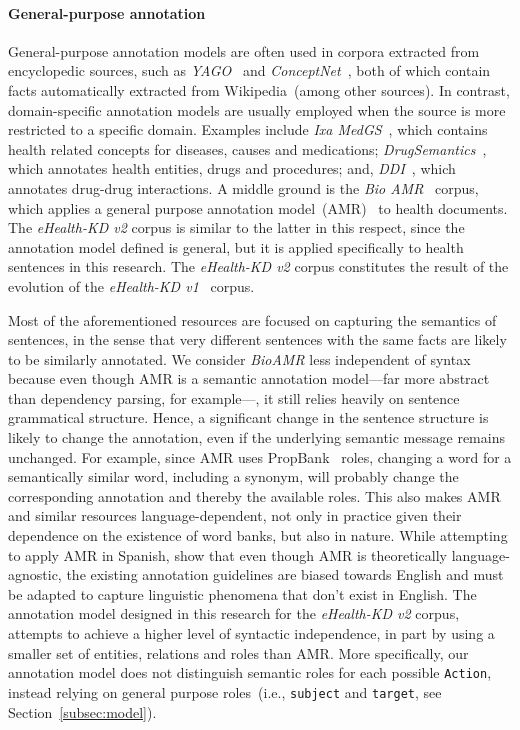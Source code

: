   \paragraph{General-purpose annotation}
  General-purpose annotation models are often used in corpora extracted from encyclopedic sources, such as \textit{YAGO}~\cite{suchanek2007yago} and \textit{ConceptNet}~\cite{speer2017conceptnet}, both of which contain facts automatically extracted from Wikipedia~(among other sources). In contrast, domain-specific annotation models are usually employed when the source is more restricted to a specific domain. Examples include \textit{Ixa MedGS}~\cite{ORONOZ2015318}, which contains health related concepts for diseases, causes and medications; \textit{DrugSemantics}~\cite{moreno2017drugsemantics}, which annotates health entities, drugs and procedures; and, \textit{DDI}~\cite{herrero2013ddi}, which annotates drug-drug interactions. A middle ground is the \textit{Bio AMR}~\cite{bioamr} corpus, which applies a general purpose annotation model~(AMR)~\cite{banarescu2013abstract} to health documents. The \textit{eHealth-KD v2} corpus is similar to the latter in this respect, since the annotation model defined is general, but it is applied specifically to health sentences in this research.
  The \textit{eHealth-KD v2} corpus constitutes the result of the evolution of the \textit{eHealth-KD v1}~\cite{ehealth} corpus.

  Most of the aforementioned resources are focused on capturing the semantics of sentences, in the sense that very different sentences with the same facts are likely to be similarly annotated. We consider \textit{BioAMR} less independent of syntax because even though AMR is a semantic annotation model---far more abstract than dependency parsing, for example---, it still relies heavily on sentence grammatical structure. Hence, a significant change in the sentence structure is likely to change the annotation, even if the underlying semantic message remains unchanged. For example, since AMR uses PropBank~\cite{propbank} roles, changing a word for a semantically similar word, including a synonym, will probably change the corresponding annotation and thereby the available roles.
  This also makes AMR and similar resources language-dependent, not only in practice given their dependence on the existence
  of word banks, but also in nature. While attempting to apply AMR in Spanish, \citet{migueles2018annotating} show that even though AMR is theoretically language-agnostic,
  the existing annotation guidelines are biased towards English and must be adapted to capture linguistic phenomena
  that don't exist in English.
  The annotation model designed in this research for the \textit{eHealth-KD v2} corpus, attempts to achieve a higher level of syntactic independence, in part by using a smaller set of entities, relations and roles than AMR. More specifically, our annotation model does not distinguish semantic roles for each possible \texttt{Action}, instead relying on general purpose roles~(i.e., \texttt{subject} and \texttt{target}, see Section~\ref{subsec:model}).

